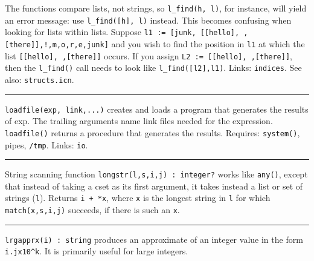 The functions compare lists, not strings, so
\texttt{l\_find({\textquotedbl}h{\textquotedbl}, l)}, for instance,
will yield an error message: use
\texttt{l\_find([{\textquotedbl}h{\textquotedbl}], l)} instead. This
becomes confusing when looking for lists within lists. Suppose
\texttt{l1 := [{\textquotedbl}junk{\textquotedbl},
[[{\textquotedbl}hello{\textquotedbl}],{\textquotedbl}
{\textquotedbl},[{\textquotedbl}there{\textquotedbl}]],{\textquotedbl}!{\textquotedbl},{\textquotedbl}m{\textquotedbl},{\textquotedbl}o{\textquotedbl},{\textquotedbl}r{\textquotedbl},{\textquotedbl}e{\textquotedbl},{\textquotedbl}junk{\textquotedbl}]}
and you wish to find the position in \texttt{l1} at which the list
\texttt{[[{\textquotedbl}hello{\textquotedbl}],{\textquotedbl}
{\textquotedbl},[{\textquotedbl}there{\textquotedbl}]]} occurs. If you
assign \texttt{L2 :=
[[{\textquotedbl}hello{\textquotedbl}],{\textquotedbl}
{\textquotedbl},[{\textquotedbl}there{\textquotedbl}]]}, then the
\texttt{l\_find()} call needs to look like \texttt{l\_find([l2],l1)}.
Links: \texttt{indices}. See also: \texttt{structs.icn}.

\vspace{0.25cm}\hrule{}

\texttt{loadfile(exp, link,...)} creates and loads a program that
generates the results of exp. The trailing arguments name link files
needed for the expression. \texttt{loadfile()} returns a procedure that
generates the results.
Requires: \texttt{system()}, pipes, \texttt{/tmp}. Links:
\texttt{io}. 

\vspace{0.25cm}\hrule{}

String scanning function \texttt{longstr(l,s,i,j) : integer?} works like
\texttt{any()}, except that instead of taking a cset as its first
argument, it takes instead a list or set of strings (\texttt{l}).
Returns \texttt{i + *x}, where \texttt{x} is the longest string in \texttt{l} for which \texttt{match(x,s,i,j)}
succeeds, if there is such an \texttt{x}.

\vspace{0.25cm}\hrule{}

\texttt{lrgapprx(i) : string} produces an approximate of an integer
value in the form \texttt{i.jx10\^{}k}. It is primarily useful for
large integers. 

